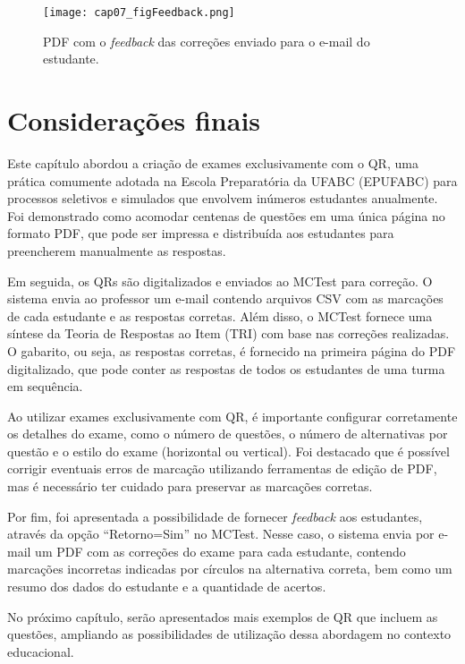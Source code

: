 \begin{figure}[htbp]
  \centering
  \texttt{[image: cap07\_figFeedback.png]}
    \caption{PDF com o \textit{feedback} das correções enviado para o e-mail do estudante.}
\label{fig:cap07_figFeedback}
\end{figure}



\section{Considerações finais}

Este capítulo abordou a criação de exames exclusivamente com o QR, uma prática comumente adotada na Escola Preparatória da UFABC (EPUFABC) para processos seletivos e simulados que envolvem inúmeros estudantes anualmente. Foi demonstrado como acomodar centenas de questões em uma única página no formato PDF, que pode ser impressa e distribuída aos estudantes para preencherem manualmente as respostas.

Em seguida, os QRs são digitalizados e enviados ao MCTest para correção. O sistema envia ao professor um e-mail contendo arquivos CSV com as marcações de cada estudante e as respostas corretas. Além disso, o MCTest fornece uma síntese da Teoria de Respostas ao Item (TRI) com base nas correções realizadas. O gabarito, ou seja, as respostas corretas, é fornecido na primeira página do PDF digitalizado, que pode conter as respostas de todos os estudantes de uma turma em sequência.

Ao utilizar exames exclusivamente com QR, é importante configurar corretamente os detalhes do exame, como o número de questões, o número de alternativas por questão e o estilo do exame (horizontal ou vertical). Foi destacado que é possível corrigir eventuais erros de marcação utilizando ferramentas de edição de PDF, mas é necessário ter cuidado para preservar as marcações corretas.

Por fim, foi apresentada a possibilidade de fornecer \textit{feedback} aos estudantes, através da opção ``Retorno=Sim'' no MCTest. Nesse caso, o sistema envia por e-mail um PDF com as correções do exame para cada estudante, contendo marcações incorretas indicadas por círculos na alternativa correta, bem como um resumo dos dados do estudante e a quantidade de acertos.

No próximo capítulo, serão apresentados mais exemplos de QR que incluem as questões, ampliando as possibilidades de utilização dessa abordagem no contexto educacional.

















